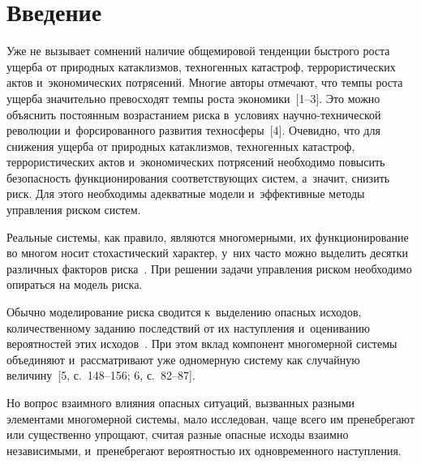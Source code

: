 
  



\thispagestyle{headings}

\begin{multicols}{2}

\label{st\stat}
  
\section{Введение}

\vspace*{-4pt}

  Уже не вызывает сомнений наличие общемировой тенденции быст\-ро\-го рос\-та 
ущерба от природных катаклизмов, техногенных катастроф, террористических 
актов и~экономических потрясений. Многие авторы отмечают, что тем\-пы рос\-та 
ущерба значительно превосходят темпы рос\-та экономики~[1--3]. Это можно 
объяснить по\-сто\-ян\-ным возрастанием рис\-ка в~условиях на\-уч\-но-тех\-ни\-че\-ской 
революции и~форсированного развития техносферы~[4]. Очевидно, что для 
снижения ущер\-ба от природных катаклизмов, техногенных катастроф, 
террористических актов и~экономических потрясений необходимо повысить 
без\-опас\-ность функционирования со\-от\-вет\-ст\-ву\-ющих сис\-тем, а~значит, снизить 
риск. Для этого необходимы адекватные модели и~эффективные методы 
управ\-ле\-ния риском сис\-тем.
  
  Реальные системы, как правило, являются многомерными, их 
функционирование во многом носит стохастический характер, у~них час\-то 
мож\-но выделить десятки различных факторов риска~\cite{1-t}. При решении 
задачи управления рис\-ком необходимо опираться на модель рис\-ка. 

Обычно 
моделирование рис\-ка сводится к~выделению опасных исходов, 
количественному заданию по\-след\-ст\-вий от их наступления и~оцениванию 
вероятностей этих исходов~\cite[с.~37--43]{5-t}. При этом вклад компонент 
многомерной сис\-те\-мы объединяют и~рас\-смат\-ри\-ва\-ют уже одномерную сис\-те\-му 
как случайную величину~[5, с.~148--156; 6, с.~82--87]. 

Но вопрос взаимного 
влияния опас\-ных ситуаций, вызванных разными элементами многомерной 
сис\-те\-мы, мало исследован, чаще всего им пренебрегают или существенно 
упрощают, считая разные опас\-ные исходы взаимно независимыми, 
и~пренебрегают ве\-ро\-ят\-ностью их одновременного наступления. 


\end{multicols}
